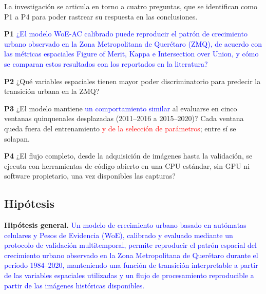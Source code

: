 La investigación se articula en torno a cuatro preguntas, que se identifican como P1 a P4 para poder rastrear su respuesta en las conclusiones.

\textbf{P1} \textcolor{blue}{¿El modelo WoE-AC calibrado puede reproducir el patrón de crecimiento urbano observado en la Zona Metropolitana de Querétaro (ZMQ), de acuerdo con las métricas espaciales Figure of Merit, Kappa e Intersection over Union, y cómo se comparan estos resultados con los reportados en la literatura?}

\textbf{P2} ¿Qué variables espaciales tienen mayor poder discriminatorio para predecir la transición urbana en la ZMQ?

\textbf{P3} ¿El modelo mantiene \textcolor{blue}{un comportamiento similar} al evaluarse en cinco ventanas quinquenales desplazadas (2011--2016 a 2015--2020)? Cada ventana queda fuera del entrenamiento \textcolor{red}{y de la selección de parámetros}; entre sí se solapan.

\textbf{P4} ¿El flujo completo, desde la adquisición de imágenes hasta la validación, se ejecuta con herramientas de código abierto en una CPU estándar, sin GPU ni software propietario, una vez disponibles las capturas?


\subsection{Hipótesis}

\textbf{Hipótesis general.} \textcolor{blue}{Un modelo de crecimiento urbano basado en autómatas celulares y Pesos de Evidencia (WoE), calibrado y evaluado mediante un protocolo de validación multitemporal, permite reproducir el patrón espacial del crecimiento urbano observado en la Zona Metropolitana de Querétaro durante el período 1984--2020, manteniendo una función de transición interpretable a partir de las variables espaciales utilizadas y un flujo de procesamiento reproducible a partir de las imágenes históricas disponibles.}

%
%

